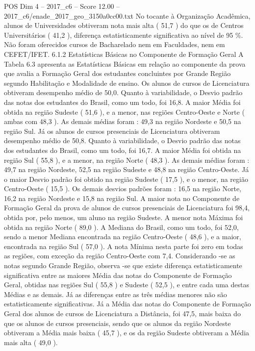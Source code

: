 \begin{textsample}{POS Dim 4 – 2017\_c6 – Score 12.00 – 2017\_c6/enade\_2017\_geo\_3150a0cc00.txt}
No tocante à Organização Acadêmica, alunos de Universidades obtiveram nota mais alta ( 51,7 ) do que os de Centros Universitários ( 41,2 ), diferença estatisticamente significativa ao nível de 95 \%.
Não foram oferecidos cursos de Bacharelado nem em Faculdades, nem em CEFET/IFET. 6.1.2 Estatísticas Básicas no Componente de Formação Geral A Tabela 6.3 apresenta as Estatísticas Básicas em relação ao componente da prova que avalia a Formação Geral dos estudantes concluintes por Grande Região segundo Habilitação e Modalidade de ensino.
Os alunos de cursos de Licenciatura obtiveram desempenho médio de 50,0.
Quanto à variabilidade, o Desvio padrão das notas dos estudantes do Brasil, como um todo, foi 16,8.
A maior Média foi obtida na região Sudeste ( 51,6 ), e a menor, nas regiões Centro-Oeste e Norte ( ambas com 48,3 ).
As demais médias foram : 49,3 na região Nordeste e 50,5 na região Sul.
Já os alunos de cursos presenciais de Licenciatura obtiveram desempenho médio de 50,8.
Quanto à variabilidade, o Desvio padrão das notas dos estudantes do Brasil, como um todo, foi 16,7.
A maior Média foi obtida na região Sul ( 55,8 ), e a menor, na região Norte ( 48,3 ).
As demais médias foram : 49,7 na região Nordeste, 52,5 na região Sudeste e 48,8 na região Centro-Oeste.
Já o maior Desvio padrão foi obtido na região Sudeste ( 17,5 ), e o menor, na região Centro-Oeste ( 15,5 ).
Os demais desvios padrões foram : 16,5 na região Norte, 16,2 na região Nordeste e 15,8 na região Sul.
A maior nota no Componente de Formação Geral da prova de alunos de cursos presenciais de Licenciatura foi 98,4, obtida por, pelo menos, um aluno na região Sudeste.
A menor nota Máxima foi obtida na região Norte ( 89,0 ).
A Mediana do Brasil, como um todo, foi 52,0, sendo a menor Mediana encontrada na região Centro-Oeste ( 48,6 ), e a maior, encontrada na região Sul ( 57,0 ).
A nota Mínima nesta parte foi zero em todas as regiões, com exceção da região Centro-Oeste com 7,4.
Considerando -se as notas segundo Grande Região, observa -se que existe diferença estatisticamente significativa entre as maiores Média das notas do Componente de Formação Geral, obtidas nas regiões Sul ( 55,8 ) e Sudeste ( 52,5 ), e entre cada uma destas Médias e as demais.
Já as diferenças entre as três médias menores não são estatisticamente significativas.
Já a Média das notas do Componente de Formação Geral dos alunos de cursos de Licenciatura a Distância, foi 47,5, mais baixa do que os alunos de cursos presenciais, sendo que os alunos da região Nordeste obtiveram a Média mais baixa ( 45,7 ), e os da região Sudeste obtiveram a Média mais alta ( 49,0 ).

\end{textsample}
